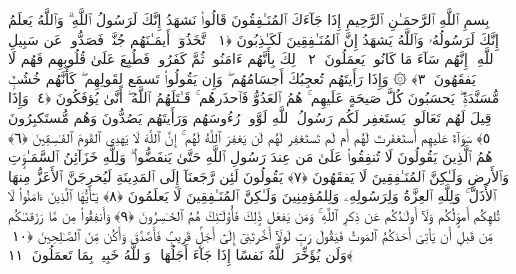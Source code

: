 
  
    
  
    
    

\nopagebreak
  بِسمِ ٱللَّهِ ٱلرَّحمَـٰنِ ٱلرَّحِيمِ
  إِذَا جَآءَكَ ٱلمُنَـٰفِقُونَ قَالُوا۟ نَشهَدُ إِنَّكَ لَرَسُولُ ٱللَّهِ ۗ وَٱللَّهُ يَعلَمُ إِنَّكَ لَرَسُولُهُۥ وَٱللَّهُ يَشهَدُ إِنَّ ٱلمُنَـٰفِقِينَ لَكَـٰذِبُونَ ﴿١﴾
 ٱتَّخَذُوٓا۟ أَيمَـٰنَهُم جُنَّةًۭ فَصَدُّوا۟ عَن سَبِيلِ ٱللَّهِ ۚ إِنَّهُم سَآءَ مَا كَانُوا۟ يَعمَلُونَ ﴿٢﴾
 ذَٟلِكَ بِأَنَّهُم ءَامَنُوا۟ ثُمَّ كَفَرُوا۟ فَطُبِعَ عَلَىٰ قُلُوبِهِم فَهُم لَا يَفقَهُونَ ﴿٣﴾
 ۞ وَإِذَا رَأَيتَهُم تُعجِبُكَ أَجسَامُهُم ۖ وَإِن يَقُولُوا۟ تَسمَع لِقَولِهِم ۖ كَأَنَّهُم خُشُبٌۭ مُّسَنَّدَةٌۭ ۖ يَحسَبُونَ كُلَّ صَيحَةٍ عَلَيهِم ۚ هُمُ ٱلعَدُوُّ فَٱحذَرهُم ۚ قَـٰتَلَهُمُ ٱللَّهُ ۖ أَنَّىٰ يُؤفَكُونَ ﴿٤﴾
 وَإِذَا قِيلَ لَهُم تَعَالَوا۟ يَستَغفِر لَكُم رَسُولُ ٱللَّهِ لَوَّوا۟ رُءُوسَهُم وَرَأَيتَهُم يَصُدُّونَ وَهُم مُّستَكبِرُونَ ﴿٥﴾
 سَوَآءٌ عَلَيهِم أَستَغفَرتَ لَهُم أَم لَم تَستَغفِر لَهُم لَن يَغفِرَ ٱللَّهُ لَهُم ۚ إِنَّ ٱللَّهَ لَا يَهدِى ٱلقَومَ ٱلفَـٰسِقِينَ ﴿٦﴾
 هُمُ ٱلَّذِينَ يَقُولُونَ لَا تُنفِقُوا۟ عَلَىٰ مَن عِندَ رَسُولِ ٱللَّهِ حَتَّىٰ يَنفَضُّوا۟ ۗ وَلِلَّهِ خَزَآئِنُ ٱلسَّمَـٰوَٟتِ وَٱلأَرضِ وَلَـٰكِنَّ ٱلمُنَـٰفِقِينَ لَا يَفقَهُونَ ﴿٧﴾
 يَقُولُونَ لَئِن رَّجَعنَآ إِلَى ٱلمَدِينَةِ لَيُخرِجَنَّ ٱلأَعَزُّ مِنهَا ٱلأَذَلَّ ۚ وَلِلَّهِ ٱلعِزَّةُ وَلِرَسُولِهِۦ وَلِلمُؤمِنِينَ وَلَـٰكِنَّ ٱلمُنَـٰفِقِينَ لَا يَعلَمُونَ ﴿٨﴾
 يَـٰٓأَيُّهَا ٱلَّذِينَ ءَامَنُوا۟ لَا تُلهِكُم أَموَٟلُكُم وَلَآ أَولَـٰدُكُم عَن ذِكرِ ٱللَّهِ ۚ وَمَن يَفعَل ذَٟلِكَ فَأُو۟لَـٰٓئِكَ هُمُ ٱلخَـٰسِرُونَ ﴿٩﴾
 وَأَنفِقُوا۟ مِن مَّا رَزَقنَـٰكُم مِّن قَبلِ أَن يَأتِىَ أَحَدَكُمُ ٱلمَوتُ فَيَقُولَ رَبِّ لَولَآ أَخَّرتَنِىٓ إِلَىٰٓ أَجَلٍۢ قَرِيبٍۢ فَأَصَّدَّقَ وَأَكُن مِّنَ ٱلصَّـٰلِحِينَ ﴿١٠﴾
 وَلَن يُؤَخِّرَ ٱللَّهُ نَفسًا إِذَا جَآءَ أَجَلُهَا ۚ وَٱللَّهُ خَبِيرٌۢ بِمَا تَعمَلُونَ ﴿١١﴾
 
